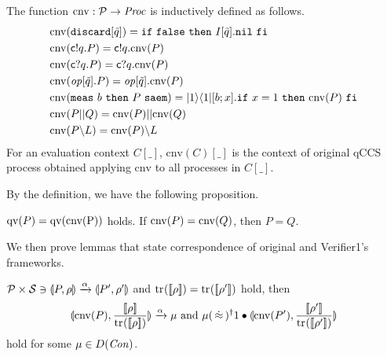 \begin{defi}
 The function $\mathrm{cnv}: \mathcal{P} \rightarrow \mathit{Proc}$
 is inductively defined as follows.
 \begin{align*}
  &\mathrm{cnv}(\mathtt{discard[}\tilde q\mathtt{]}) =
  \mathtt{if}~\mathtt{false}~\mathtt{then}~I[\tilde q].\mathtt{nil}~\mathtt{fi}\\
  &\mathrm{cnv}(\mathsf{c}! q.P) = \mathsf{c}! q.\mathrm{cnv}(P) \\
  &\mathrm{cnv}(\mathsf{c}? q.P) = \mathsf{c}? q.\mathrm{cnv}(P)\\
  &\mathrm{cnv}(\mathit{op}\mathtt{[}\tilde q\mathtt{]}.P) =
  \mathit{op}\mathtt{[}\tilde q\mathtt{]}.\mathrm{cnv}(P) \\
  &\mathrm{cnv}({\tt meas}~b~{\tt then}~P~{\tt saem}) = |1\rangle\langle 1|[b;x].\mathtt{if}~x = 1~\mathtt{then}~\mathrm{cnv}(P)~\mathtt{fi}\\
  &\mathrm{cnv}(P||Q) = \mathrm{cnv}(P)||\mathrm{cnv}(Q)\\
  &\mathrm{cnv}(P \backslash L) = \mathrm{cnv}(P)\backslash L
 \end{align*}
For an evaluation context $C[\_]$, $\mathrm{cnv}(C)[\_]$ is the
context of original qCCS process obtained applying $\mathrm{cnv}$ to
all processes in $C[\_]$. 
\end{defi}
By the definition, we have the following proposition.
\begin{prop}
\label{symqccs:cnvinj}
 $\mathrm{qv}(P)=\mathrm{qv}(\mathrm{cnv(P)})$ holds.
 If $\mathrm{cnv}(P) = \mathrm{cnv}(Q)$, then $P = Q$. 
\end{prop}
We then prove lemmas that state correspondence of original and
Verifier1's frameworks.
\begin{lem}
 $\mathcal{P} \times \mathcal{S} \ni
 \llparenthesis P, \rho \rrparenthesis \xrightarrow{\alpha} \llparenthesis P', \rho' \rrparenthesis$ and
 ${\rm tr}_{}([\![\rho]\!]) =
 {\rm tr}_{}([\![\rho']\!])$ hold, then 
 \[
   \con{\cnv{P}}{\frac{\braw{\rho}}{\tr{}{\braw{\rho}}}} 
 \xrightarrow{\alpha} \mu \mbox{ and }
\mu (\strg)^\dagger 1\bullet
 \con{\cnv{P'}}{\frac{\braw{\rho'}}{\tr{}{\braw{\rho'}}}}
 \]
 hold for some $\mu \in D(\mathit{Con})$.
\end{lem}
